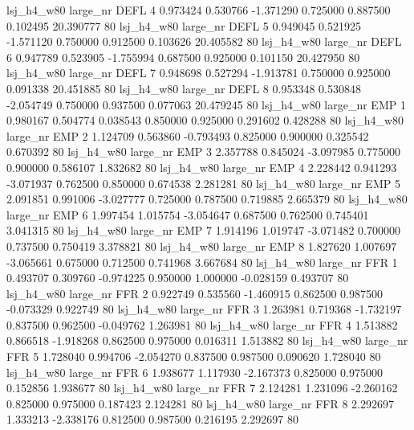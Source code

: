   lsj_h4_w80   large_nr     DEFL                 4  0.973424  0.530766  -1.371290 0.725000 0.887500  0.102495   20.390777 80
  lsj_h4_w80   large_nr     DEFL                 5  0.949045  0.521925  -1.571120 0.750000 0.912500  0.103626   20.405582 80
  lsj_h4_w80   large_nr     DEFL                 6  0.947789  0.523905  -1.755994 0.687500 0.925000  0.101150   20.427950 80
  lsj_h4_w80   large_nr     DEFL                 7  0.948698  0.527294  -1.913781 0.750000 0.925000  0.091338   20.451885 80
  lsj_h4_w80   large_nr     DEFL                 8  0.953348  0.530848  -2.054749 0.750000 0.937500  0.077063   20.479245 80
  lsj_h4_w80   large_nr      EMP                 1  0.980167  0.504774   0.038543 0.850000 0.925000  0.291602    0.428288 80
  lsj_h4_w80   large_nr      EMP                 2  1.124709  0.563860  -0.793493 0.825000 0.900000  0.325542    0.670392 80
  lsj_h4_w80   large_nr      EMP                 3  2.357788  0.845024  -3.097985 0.775000 0.900000  0.586107    1.832682 80
  lsj_h4_w80   large_nr      EMP                 4  2.228442  0.941293  -3.071937 0.762500 0.850000  0.674538    2.281281 80
  lsj_h4_w80   large_nr      EMP                 5  2.091851  0.991006  -3.027777 0.725000 0.787500  0.719885    2.665379 80
  lsj_h4_w80   large_nr      EMP                 6  1.997454  1.015754  -3.054647 0.687500 0.762500  0.745401    3.041315 80
  lsj_h4_w80   large_nr      EMP                 7  1.914196  1.019747  -3.071482 0.700000 0.737500  0.750419    3.378821 80
  lsj_h4_w80   large_nr      EMP                 8  1.827620  1.007697  -3.065661 0.675000 0.712500  0.741968    3.667684 80
  lsj_h4_w80   large_nr      FFR                 1  0.493707  0.309760  -0.974225 0.950000 1.000000 -0.028159    0.493707 80
  lsj_h4_w80   large_nr      FFR                 2  0.922749  0.535560  -1.460915 0.862500 0.987500 -0.073329    0.922749 80
  lsj_h4_w80   large_nr      FFR                 3  1.263981  0.719368  -1.732197 0.837500 0.962500 -0.049762    1.263981 80
  lsj_h4_w80   large_nr      FFR                 4  1.513882  0.866518  -1.918268 0.862500 0.975000  0.016311    1.513882 80
  lsj_h4_w80   large_nr      FFR                 5  1.728040  0.994706  -2.054270 0.837500 0.987500  0.090620    1.728040 80
  lsj_h4_w80   large_nr      FFR                 6  1.938677  1.117930  -2.167373 0.825000 0.975000  0.152856    1.938677 80
  lsj_h4_w80   large_nr      FFR                 7  2.124281  1.231096  -2.260162 0.825000 0.975000  0.187423    2.124281 80
  lsj_h4_w80   large_nr      FFR                 8  2.292697  1.333213  -2.338176 0.812500 0.987500  0.216195    2.292697 80
